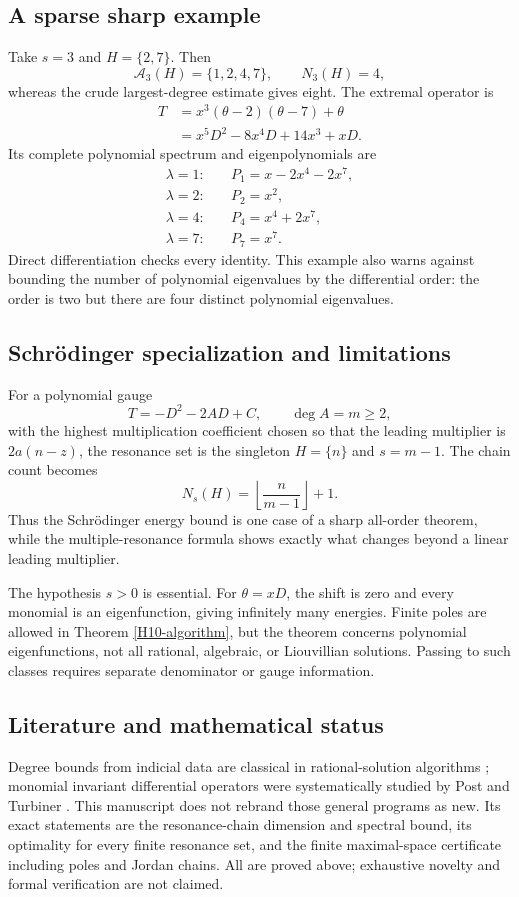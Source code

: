 \documentclass[11pt,a4paper]{article}
\theoremstyle{definition}\newtheorem{definition}[theorem]{Definition}
\theoremstyle{remark}\newtheorem{remark}[theorem]{Remark}
\numberwithin{equation}{section}
\begin{document}
\subsection{A sparse sharp example}\label{H10-sec-5}
Take $s=3$ and $H=\{2,7\}$. Then
\[\mathcal A_3(H)=\{1,2,4,7\},\qquad N_3(H)=4,
\]
whereas the crude largest-degree estimate gives eight. The extremal operator is
\begin{align*}
T&=x^3(\theta-2)(\theta-7)+\theta\\
 &=x^5D^2-8x^4D+14x^3+xD.
\end{align*}
Its complete polynomial spectrum and eigenpolynomials are
\begin{align*}
\lambda=1:&\quad P_1=x-2x^4-2x^7,\\
\lambda=2:&\quad P_2=x^2,\\
\lambda=4:&\quad P_4=x^4+2x^7,\\
\lambda=7:&\quad P_7=x^7.
\end{align*}
Direct differentiation checks every identity. This example also warns against bounding the number of polynomial eigenvalues by the differential order: the order is two but there are four distinct polynomial eigenvalues.
\subsection{Schr\"odinger specialization and limitations}\label{H10-sec-6}
For a polynomial gauge
\[T=-D^2-2A D+C,\qquad\deg A=m\ge2,
\]
with the highest multiplication coefficient chosen so that the leading multiplier is $2a(n-z)$, the resonance set is the singleton $H=\{n\}$ and $s=m-1$. The chain count becomes
\[N_s(H)=\left\lfloor\frac{n}{m-1}\right\rfloor+1.
\]
Thus the Schr\"odinger energy bound is one case of a sharp all-order theorem, while the multiple-resonance formula shows exactly what changes beyond a linear leading multiplier.

The hypothesis $s>0$ is essential. For $\theta=xD$, the shift is zero and every monomial is an eigenfunction, giving infinitely many energies. Finite poles are allowed in Theorem \ref{H10-algorithm}, but the theorem concerns polynomial eigenfunctions, not all rational, algebraic, or Liouvillian solutions. Passing to such classes requires separate denominator or gauge information.
\subsection{Literature and mathematical status}\label{H10-sec-7}
Degree bounds from indicial data are classical in rational-solution algorithms \cite{ref089}; monomial invariant differential operators were systematically studied by Post and Turbiner \cite{ref084}. This manuscript does not rebrand those general programs as new. Its exact statements are the resonance-chain dimension and spectral bound, its optimality for every finite resonance set, and the finite maximal-space certificate including poles and Jordan chains. All are proved above; exhaustive novelty and formal verification are not claimed.
\end{document}
